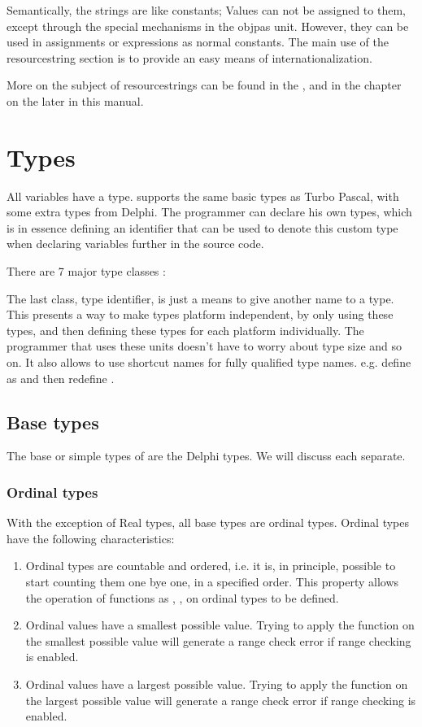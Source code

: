 Semantically, the strings are like constants; Values can not be assigned  to
them, except through the special mechanisms in the objpas unit. However,
they can be used in assignments or expressions as normal constants.
The main use of the resourcestring section is to provide an easy means
of internationalization.

More on the subject of resourcestrings can be found in the \progref, and
in the chapter on the  later in this manual.

\chapter{Types}
All variables have a type. \fpc supports the same basic types as Turbo
Pascal, with some extra types from Delphi.
The programmer can declare his own types, which is in essence defining an identifier
that can be used to denote this custom type when declaring variables further
in the source code.

There are 7 major type classes :

The last class, {\sffamily type identifier}, is just a means to give another
name to a type. This presents a way to make types platform independent, by
only using these types, and then defining these types for each platform
individually. The programmer that uses these units doesn't have to worry
about type size and so on. It also allows to use shortcut names for
fully qualified type names. e.g. define  as
 and then redefine .

\section{Base types}
The base or simple types of \fpc are the Delphi types.
We will discuss each separate.

\subsection{Ordinal types}
With the exception of Real types, all base types are ordinal types.
Ordinal types have the following characteristics:
\begin{enumerate}
\item Ordinal types are countable and ordered, i.e. it is, in principle,
possible to start counting them one bye one, in a specified order.
This property allows the operation of functions as , ,
on ordinal types to be defined.
\item Ordinal values have a smallest possible value. Trying to apply the
 function on the smallest possible value will generate a range
check error if range checking is enabled.
\item Ordinal values have a largest possible value. Trying to apply the
 function on the largest possible value will generate a range
check error if range checking is enabled.
\end{enumerate}
